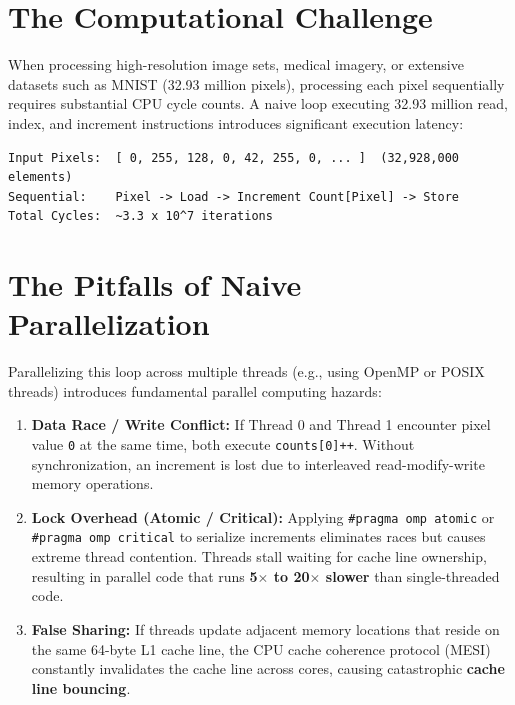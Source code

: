 \documentclass[12pt,a4paper,oneside]{report}
\begin{document}
\section{The Computational Challenge}
When processing high-resolution image sets, medical imagery, or extensive datasets such as MNIST (32.93 million pixels), processing each pixel sequentially requires substantial CPU cycle counts. A naive loop executing 32.93 million read, index, and increment instructions introduces significant execution latency:
\begin{verbatim}
Input Pixels:  [ 0, 255, 128, 0, 42, 255, 0, ... ]  (32,928,000 elements)
Sequential:    Pixel -> Load -> Increment Count[Pixel] -> Store
Total Cycles:  ~3.3 x 10^7 iterations
\end{verbatim}

\section{The Pitfalls of Naive Parallelization}
Parallelizing this loop across multiple threads (e.g., using OpenMP or POSIX threads) introduces fundamental parallel computing hazards:
\begin{enumerate}
    \item \textbf{Data Race / Write Conflict:} If Thread 0 and Thread 1 encounter pixel value \texttt{0} at the same time, both execute \texttt{counts[0]++}. Without synchronization, an increment is lost due to interleaved read-modify-write memory operations.
    \item \textbf{Lock Overhead (Atomic / Critical):} Applying \texttt{\#pragma omp atomic} or \texttt{\#pragma omp critical} to serialize increments eliminates races but causes extreme thread contention. Threads stall waiting for cache line ownership, resulting in parallel code that runs \textbf{5$\times$ to 20$\times$ slower} than single-threaded code.
    \item \textbf{False Sharing:} If threads update adjacent memory locations that reside on the same 64-byte L1 cache line, the CPU cache coherence protocol (MESI) constantly invalidates the cache line across cores, causing catastrophic \textbf{cache line bouncing}.
\end{enumerate}
\end{document}
